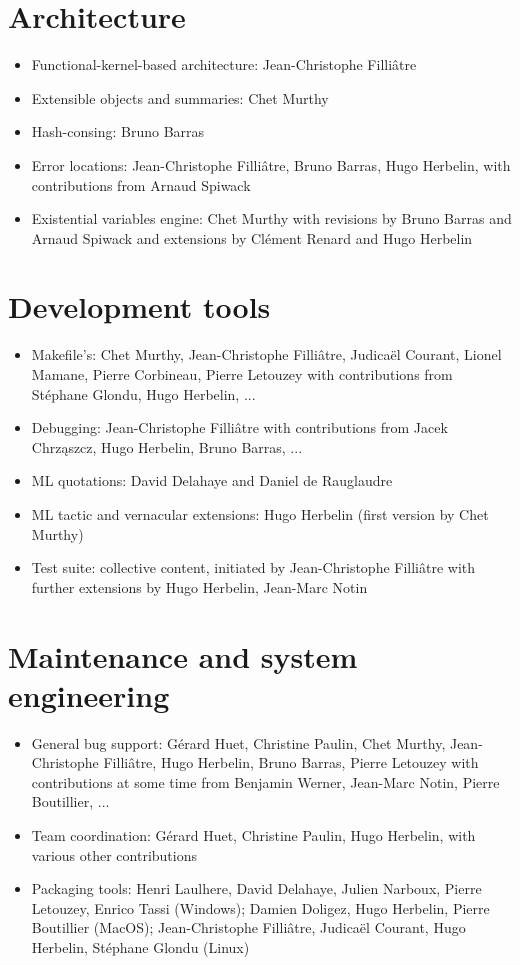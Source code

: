 \documentclass{article}
\begin{document}
\section{Architecture}

\begin{itemize}
\item Functional-kernel-based architecture: Jean-Christophe Filliâtre
\item Extensible objects and summaries: Chet Murthy
\item Hash-consing: Bruno Barras
\item Error locations: Jean-Christophe Filliâtre, Bruno Barras, Hugo Herbelin, with contributions from Arnaud Spiwack
\item Existential variables engine: Chet Murthy with revisions by
  Bruno Barras and Arnaud Spiwack and extensions by Clément Renard and
  Hugo Herbelin
\end{itemize}

\section{Development tools}

\begin{itemize}
\item Makefile's: Chet Murthy, Jean-Christophe Filliâtre, Judicaël
  Courant, Lionel Mamane, Pierre Corbineau, Pierre Letouzey with
  contributions from Stéphane Glondu, Hugo Herbelin, ...
\item Debugging: Jean-Christophe Filliâtre with contributions from Jacek Chrz\k{a}szcz, Hugo Herbelin, Bruno Barras, ...
\item ML quotations: David Delahaye and Daniel de Rauglaudre
\item ML tactic and vernacular extensions: Hugo Herbelin (first version by Chet Murthy)
\item Test suite: collective content, initiated by Jean-Christophe Filliâtre with further extensions by Hugo Herbelin, Jean-Marc Notin
\end{itemize}

\section{Maintenance and system engineering}

\begin{itemize}
\item General bug support: Gérard Huet, Christine Paulin, Chet Murthy,
  Jean-Christophe Filliâtre, Hugo Herbelin, Bruno Barras, Pierre
  Letouzey with contributions at some time from Benjamin Werner,
  Jean-Marc Notin, Pierre Boutillier, ...
\item Team coordination: Gérard Huet, Christine Paulin, Hugo Herbelin,
  with various other contributions
\item Packaging tools: Henri Laulhere, David Delahaye, Julien Narboux,
  Pierre Letouzey, Enrico Tassi (Windows); Damien Doligez, Hugo
  Herbelin, Pierre Boutillier (MacOS); Jean-Christophe Filliâtre,
  Judicaël Courant, Hugo Herbelin, Stéphane Glondu (Linux)
\end{itemize}
\end{document}
